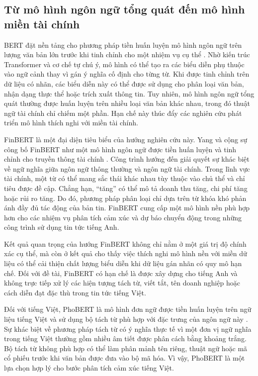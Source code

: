 \documentclass[12pt, a4paper, oneside]{report}
\begin{document}
\subsection{Từ mô hình ngôn ngữ tổng quát đến mô hình miền tài chính}

BERT đặt nền tảng cho phương pháp tiền huấn luyện mô hình ngôn ngữ trên lượng văn bản
lớn trước khi tinh chỉnh cho một nhiệm vụ cụ thể \cite{Devlin2019_bert}. Nhờ kiến trúc
Transformer và cơ chế tự chú ý, mô hình có thể tạo ra các biểu diễn phụ thuộc vào ngữ
cảnh thay vì gán ý nghĩa cố định cho từng từ. Khi được tinh chỉnh trên dữ liệu có nhãn,
các biểu diễn này có thể được sử dụng cho phân loại văn bản, nhận dạng thực thể hoặc
trích xuất thông tin. Tuy nhiên, mô hình ngôn ngữ tổng quát thường được huấn luyện trên
nhiều loại văn bản khác nhau, trong đó thuật ngữ tài chính chỉ chiếm một phần. Hạn chế
này thúc đẩy các nghiên cứu phát triển mô hình thích nghi với miền tài chính.

FinBERT là một đại diện tiêu biểu của hướng nghiên cứu này. Yang và cộng sự công bố
FinBERT như một mô hình ngôn ngữ được tiền huấn luyện và tinh chỉnh cho truyền thông
tài chính \cite{Yang2020_200608097v2}. Công trình hướng đến giải quyết sự khác biệt về
ngữ nghĩa giữa ngôn ngữ thông thường và ngôn ngữ tài chính. Trong lĩnh vực tài chính,
một từ có thể mang sắc thái khác nhau tùy thuộc vào chủ thể và chỉ tiêu được đề cập.
Chẳng hạn, ``tăng'' có thể mô tả doanh thu tăng, chi phí tăng hoặc rủi ro tăng. Do đó,
phương pháp phân loại chỉ dựa trên từ khóa khó phản ánh đầy đủ tác động của bản tin.
FinBERT cung cấp một mô hình nền phù hợp hơn cho các nhiệm vụ phân tích cảm xúc và dự
báo chuyển động trong những công trình sử dụng tin tức tiếng Anh.

Kết quả quan trọng của hướng FinBERT không chỉ nằm ở một giá trị độ chính xác cụ thể,
mà còn ở kết quả cho thấy việc thích nghi mô hình nền với miền dữ liệu có thể cải thiện
chất lượng biểu diễn khi dữ liệu gán nhãn có quy mô hạn chế. Đối với đề tài, FinBERT có
hạn chế là được xây dựng cho tiếng Anh và không trực tiếp xử lý các hiện tượng tách từ,
viết tắt, tên doanh nghiệp hoặc cách diễn đạt đặc thù trong tin tức tiếng Việt.

Đối với tiếng Việt, PhoBERT là mô hình đơn ngữ được tiền huấn luyện trên ngữ liệu tiếng
Việt và sử dụng bộ tách từ phù hợp với đặc trưng của ngôn ngữ này
\cite{Nguyen2020_200300744v3}. Sự khác biệt về phương pháp tách từ có ý nghĩa thực tế
vì một đơn vị ngữ nghĩa trong tiếng Việt thường gồm nhiều âm tiết được phân cách bằng
khoảng trắng. Bộ tách từ không phù hợp có thể làm phân mảnh tên riêng, thuật ngữ hoặc
mã cổ phiếu trước khi văn bản được đưa vào bộ mã hóa. Vì vậy, PhoBERT là một lựa chọn
hợp lý cho bước phân tích cảm xúc tiếng Việt.
\end{document}
